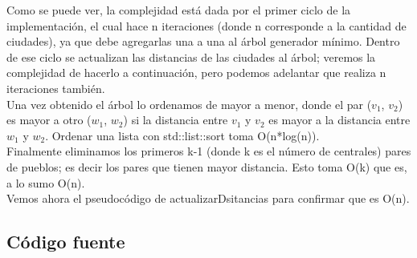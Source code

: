 Como se puede ver, la complejidad est\'a dada por el primer ciclo de la implementaci\'on, el cual hace n iteraciones (donde n corresponde a la cantidad de ciudades), ya que debe agregarlas una a una al \'arbol generador m\'inimo. Dentro de ese ciclo se actualizan las distancias de las ciudades al \'arbol; veremos la complejidad de hacerlo a continuaci\'on, pero podemos adelantar que realiza n iteraciones tambi\'en.\\
Una vez obtenido el \'arbol lo ordenamos de mayor a menor, donde el par ($v_1$, $v_2$) es mayor a otro ($w_1$, $w_2$) si la distancia entre $v_1$ y $v_2$ es mayor a la distancia entre $w_1$ y $w_2$. Ordenar una lista con std::list::sort toma O(n*log(n)).\\
Finalmente eliminamos los primeros k-1 (donde k es el n\'umero de centrales) pares de pueblos; es decir los pares que tienen mayor distancia. Esto toma O(k) que es, a lo sumo O(n).\\

Vemos ahora el pseudoc\'odigo de actualizarDsitancias para confirmar que es O(n).\\


\newpage

\subsection{C\'odigo fuente}

